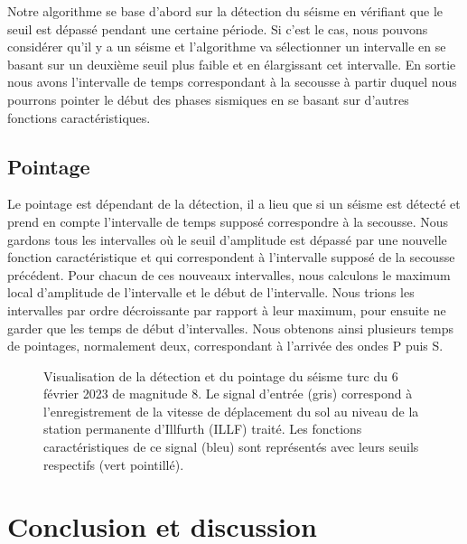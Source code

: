 \documentclass[a4paper, 11pt]{article} %
\begin{document}
Notre algorithme se base d'abord sur la détection du séisme en vérifiant que le seuil est dépassé pendant une certaine période. Si c'est le cas, nous pouvons considérer qu'il y a un séisme et l'algorithme va sélectionner un intervalle en se basant sur un deuxième seuil plus faible et en élargissant cet intervalle. En sortie nous avons l'intervalle de temps correspondant à la secousse à partir duquel nous pourrons pointer le début des phases sismiques en se basant sur d'autres fonctions caractéristiques.

\subsection{Pointage}

Le pointage est dépendant de la détection, il a lieu que si un séisme est détecté et prend en compte l'intervalle de temps supposé correspondre à la secousse. Nous gardons tous les intervalles où le seuil d'amplitude est dépassé par une nouvelle fonction caractéristique et qui correspondent à l'intervalle supposé de la secousse précédent. Pour chacun de ces nouveaux intervalles, nous calculons le maximum local d'amplitude de l'intervalle et le début de l'intervalle. Nous trions les intervalles par ordre décroissante par rapport à leur maximum, pour ensuite ne garder que les temps de début d'intervalles. Nous obtenons ainsi plusieurs temps de pointages, normalement deux, correspondant à l'arrivée des ondes P puis S.

\begin{figure}[!ht]
    \centering
    \scalebox{.9}{}
    \caption{Visualisation de la détection et du pointage du séisme turc du 6 février 2023 de magnitude 8. Le signal d'entrée (gris) correspond à l'enregistrement de la vitesse de déplacement du sol au niveau de la station permanente d'Illfurth (ILLF) traité. Les fonctions caractéristiques de ce signal (bleu) sont représentés avec leurs seuils respectifs (vert pointillé).}
    \label{fig:pointage-turquie}
\end{figure}

\section{Conclusion et discussion}
\end{document}
